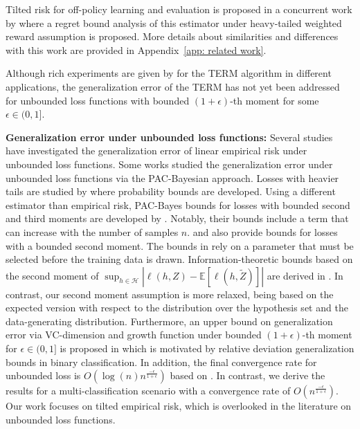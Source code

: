 \documentclass{article}
\theoremstyle{plain}
\theoremstyle{plain}
\theoremstyle{definition}
\theoremstyle{remark}
\begin{document}
 Tilted risk for off-policy learning and evaluation is proposed in a concurrent work by \citet{behnamnialog} where a regret bound analysis of this estimator under heavy-tailed weighted reward assumption is proposed. More details about similarities and differences with this work are provided in Appendix~\ref{app: related work}.
 
Although rich experiments are given by \citet{li2020tilted} for the TERM algorithm in different applications, the generalization error of the TERM has not yet been addressed for unbounded loss functions with bounded $(1+\epsilon)$-th moment for some $\epsilon\in(0,1]$.

\textbf{Generalization error under unbounded loss functions:} Several studies have investigated the generalization error of linear empirical risk under unbounded loss functions. Some works studied the generalization error under unbounded loss functions via the PAC-Bayesian approach. Losses with heavier tails are studied by \citet{alquier2018simpler} where probability bounds  are developed. Using a different estimator than empirical risk, PAC-Bayes bounds for losses with bounded second and third moments are developed by \citet{holland2019pac}. Notably, their bounds include a term that can increase with the number of samples $n$. \citet{kuzborskij2019efron} and \citet{haddouche2022pac} also provide bounds for losses with a bounded second moment. The bounds in \citet{haddouche2022pac}
rely on a parameter that must be selected before the training data is drawn. Information-theoretic bounds based on the second moment of $\sup_{h\in\mathcal{H}}|\ell(h,Z)-\mathbb{E}[\ell(h,\tilde Z)]|$ are derived in \citet{lugosi2022generalization,lugosi2023online}. In contrast, our second moment assumption  is more relaxed, being based on the expected version with respect to the distribution over the hypothesis set and the data-generating distribution. Furthermore, an upper bound on generalization error via VC-dimension and growth function under bounded $(1+\epsilon)$-th moment for $\epsilon\in(0,1]$ is proposed in \citep[Corollary 12]{cortes2019relative} which is motivated by relative deviation generalization bounds in binary classification. In addition, the final convergence rate for unbounded loss is $O(\log(n)n^{\frac{-\epsilon}{1+\epsilon}})$ based on \citep[Corollary 12]{cortes2019relative}. In contrast, we derive the results for a multi-classification scenario with a convergence rate of $O(n^{\frac{-\epsilon}{1+\epsilon}})$. Our work 
focuses on tilted empirical risk,  which is overlooked in the literature on unbounded loss functions.
\end{document}
